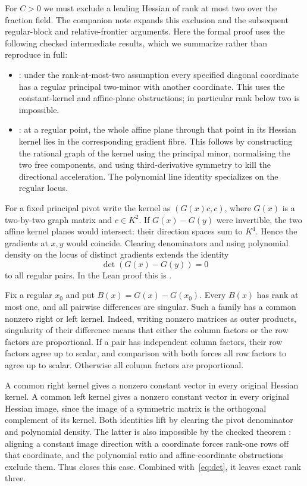 \documentclass[11pt,a4paper]{article}
\begin{document}
For $C>0$ we must exclude a leading Hessian of rank at most two over the fraction field. The companion note  expands this exclusion and the subsequent regular-block and relative-frontier arguments. Here the formal proof uses the following checked intermediate results, which we summarize rather than reproduce in full:
\begin{itemize}
\item {}: under the rank-at-most-two assumption every specified diagonal coordinate has a regular principal two-minor with another coordinate. This uses the constant-kernel and affine-plane obstructions; in particular rank below two is impossible.
\item {}: at a regular point, the whole affine plane through that point in its Hessian kernel lies in the corresponding gradient fibre. This follows by constructing the rational graph of the kernel using the principal minor, normalising the two free components, and using third-derivative symmetry to kill the directional acceleration. The polynomial line identity specializes on the regular locus.
\end{itemize}
For a fixed principal pivot write the kernel as $(G(x)c,c)$, where $G(x)$ is a two-by-two graph matrix and $c\in K^2$. If $G(x)-G(y)$ were invertible, the two affine kernel planes would intersect: their direction spaces sum to $K^4$. Hence the gradients at $x,y$ would coincide. Clearing denominators and using polynomial density on the locus of distinct gradients extends the identity
\[
 \det(G(x)-G(y))=0
\]
to all regular pairs. In the Lean proof this is .

Fix a regular $x_0$ and put $B(x)=G(x)-G(x_0)$. Every $B(x)$ has rank at most one, and all pairwise differences are singular. Such a family has a common nonzero right or left kernel. Indeed, writing nonzero matrices as outer products, singularity of their difference means that either the column factors or the row factors are proportional. If a pair has independent column factors, their row factors agree up to scalar, and comparison with both forces all row factors to agree up to scalar. Otherwise all column factors are proportional.

A common right kernel gives a nonzero constant vector in every original Hessian kernel. A common left kernel gives a nonzero constant vector in every original Hessian image, since the image of a symmetric matrix is the orthogonal complement of its kernel. Both identities lift by clearing the pivot denominator and polynomial density. The latter is also impossible by the checked theorem : aligning a constant image direction with a coordinate forces rank-one rows off that coordinate, and the polynomial ratio and affine-coordinate obstructions exclude them. Thus  closes this case. Combined with~\eqref{eq:det}, it leaves exact rank three.
\end{document}
